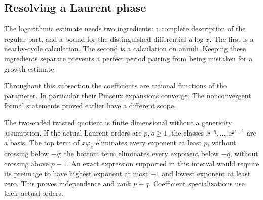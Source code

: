 \subsection{Resolving a Laurent phase}\label{sec:laurentresolution}

The logarithmic estimate needs two ingredients: a complete description
of the regular part, and a bound for the distinguished differential
$d\log x$. The first is a nearby-cycle calculation. The second is a
calculation on annuli. Keeping these ingredients separate prevents a
perfect period pairing from being mistaken for a growth estimate.

Throughout this subsection the coefficients are rational functions of
the parameter. In particular their Puiseux expansions converge. The
nonconvergent formal statements proved earlier have a different scope.

The two-ended twisted quotient is finite dimensional without a
genericity assumption. If the actual Laurent orders are $p,q\geq1$,
the classes $x^{-q},\ldots,x^{p-1}$ are a basis. The top term of
$x\varphi_x$ eliminates every exponent at least $p$, without crossing
below $-q$; the bottom term eliminates every exponent below $-q$,
without crossing above $p-1$. An exact expression supported in this
interval would require its preimage to have highest exponent at most
$-1$ and lowest exponent at least zero. This proves independence
and rank $p+q$. Coefficient specializations use their actual orders.

